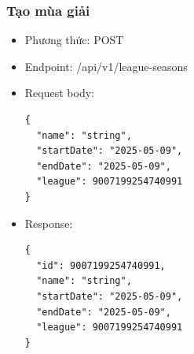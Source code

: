 \documentclass[../BTL.tex]{subfiles}
\begin{document}
\subsubsection{ Tạo mùa giải}
\begin{itemize}
    \item Phương thức: POST
    \item Endpoint: /api/v1/league-seasons
    \item Request body:
        \begin{verbatim}
{
  "name": "string",
  "startDate": "2025-05-09",
  "endDate": "2025-05-09",
  "league": 9007199254740991
}
        \end{verbatim}
    \item Response:
        \begin{verbatim}
{
  "id": 9007199254740991,
  "name": "string",
  "startDate": "2025-05-09",
  "endDate": "2025-05-09",
  "league": 9007199254740991
}
        \end{verbatim}
\end{itemize}
\end{document}
